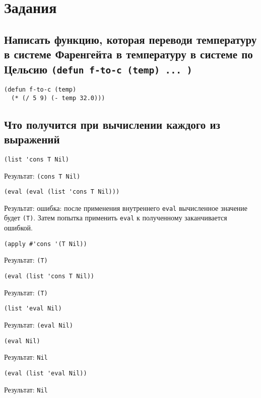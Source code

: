 \chapter{Задания}

\section{Написать функцию, которая переводи температуру в системе Фаренгейта в температуру в системе по Цельсию \texttt{(defun f-to-c (temp) ... )}}

\begin{lstlisting}
(defun f-to-c (temp) 
  (* (/ 5 9) (- temp 32.0)))
\end{lstlisting}

\section{Что получится при вычислении каждого из выражений}

\begin{lstlisting}
(list 'cons T Nil)
\end{lstlisting}
Результат: \texttt{(cons T Nil)}

\begin{lstlisting}
(eval (eval (list 'cons T Nil)))
\end{lstlisting}
Результат: ошибка: после применения внутреннего \texttt{eval} вычисленное значение будет \texttt{(T)}. Затем попытка применить \texttt{eval} к полученному заканчивается ошибкой.

\begin{lstlisting}
(apply #'cons '(T Nil))
\end{lstlisting}
Результат: \texttt{(T)}

\begin{lstlisting}
(eval (list 'cons T Nil))
\end{lstlisting}
Результат: \texttt{(T)}

\begin{lstlisting}
(list 'eval Nil)
\end{lstlisting}
Результат: \texttt{(eval Nil)}

\begin{lstlisting}
(eval Nil)
\end{lstlisting}
Результат: \texttt{Nil}

\begin{lstlisting}
(eval (list 'eval Nil))
\end{lstlisting}
Результат: \texttt{Nil}

